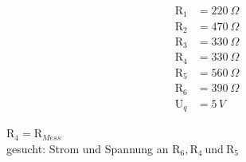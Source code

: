   \begin{align*}
    \text{R}_{1} &= 220\ \Omega \\
    \text{R}_{2} &= 470\ \Omega \\
    \text{R}_{3} &= 330\ \Omega \\
    \text{R}_{4} &= 330\ \Omega \\
    \text{R}_{5} &= 560\ \Omega \\
    \text{R}_{6} &= 390\ \Omega \\
    \text{U}_q &= 5\,V
  \end{align*}

  $\text{R}_4 = \text{R}_{Mess}$ \\gesucht: Strom und Spannung an $\text{R}_6, \text{R}_4\  \text{und} \ \text{R}_5$\\
